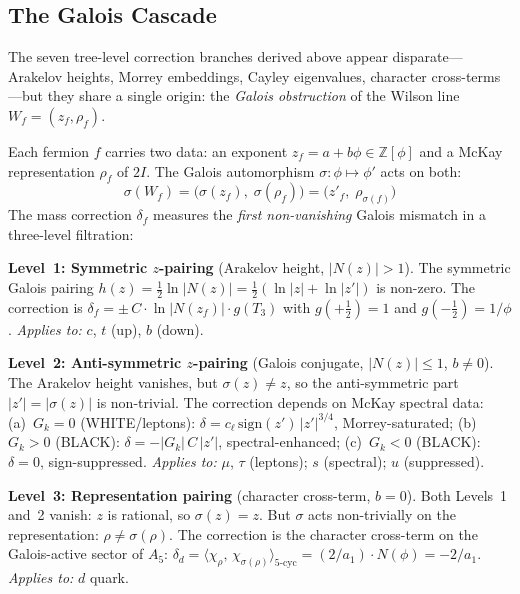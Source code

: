 \documentclass[12pt,a4paper]{article}
\theoremstyle{definition}
\begin{document}
\subsection{The Galois Cascade}
\label{sec:galois_cascade}

The seven tree-level correction branches derived above appear disparate---Arakelov heights, Morrey embeddings, Cayley eigenvalues, character cross-terms---but they share a single origin: the \emph{Galois obstruction} of the Wilson line $W_f = (z_f, \rho_f)$.

Each fermion $f$ carries two data: an exponent $z_f = a + b\phi \in \mathbb{Z}[\phi]$ and a McKay representation $\rho_f$ of $2I$.  The Galois automorphism $\sigma: \phi \mapsto \phi'$ acts on both:
\begin{equation}
\sigma(W_f) = \bigl(\sigma(z_f),\; \sigma(\rho_f)\bigr) = \bigl(z'_f,\; \rho_{\sigma(f)}\bigr)
\end{equation}
The mass correction $\delta_f$ measures the \emph{first non-vanishing} Galois mismatch in a three-level filtration:

\noindent\textbf{Level~1: Symmetric $z$-pairing} (Arakelov height, $|N(z)| > 1$).
  The symmetric Galois pairing $h(z) = \tfrac{1}{2}\ln|N(z)| = \tfrac{1}{2}(\ln|z| + \ln|z'|)$ is non-zero.  The correction is
  $\delta_f = \pm\,C \cdot \ln|N(z_f)| \cdot g(T_3)$
  with $g(+\tfrac{1}{2}) = 1$ and $g(-\tfrac{1}{2}) = 1/\phi$.
  \emph{Applies to:} $c$, $t$ (up), $b$ (down).

\smallskip\noindent\textbf{Level~2: Anti-symmetric $z$-pairing} (Galois conjugate, $|N(z)| \leq 1$, $b \neq 0$).
  The Arakelov height vanishes, but $\sigma(z) \neq z$, so the anti-symmetric part $|z'| = |\sigma(z)|$ is non-trivial.  The correction depends on McKay spectral data:
  (a)~$G_k = 0$ (WHITE/leptons): $\delta = c_\ell\,\mathrm{sign}(z')\,|z'|^{3/4}$, Morrey-saturated;
  (b)~$G_k > 0$ (BLACK): $\delta = -|G_k|\,C\,|z'|$, spectral-enhanced;
  (c)~$G_k < 0$ (BLACK): $\delta = 0$, sign-suppressed.
  \emph{Applies to:} $\mu$, $\tau$ (leptons); $s$ (spectral); $u$ (suppressed).

\smallskip\noindent\textbf{Level~3: Representation pairing} (character cross-term, $b = 0$).
  Both Levels~1 and~2 vanish: $z$ is rational, so $\sigma(z) = z$.  But $\sigma$ acts non-trivially on the representation: $\rho \neq \sigma(\rho)$.  The correction is the character cross-term on the Galois-active sector of $A_5$:
  $\delta_d = \langle\chi_\rho,\,\chi_{\sigma(\rho)}\rangle_{\text{5-cyc}} = (2/a_1)\cdot N(\phi) = -2/a_1$.
  \emph{Applies to:} $d$ quark.
\end{document}
